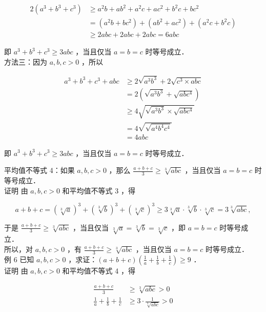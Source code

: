 \documentclass[10pt]{article}
\begin{document}
\[
\begin{aligned}
2\left(a^{3}+b^{3}+c^{3}\right) & \geqslant a^{2} b+a b^{2}+a^{2} c+a c^{2}+b^{2} c+b c^{2} \\
& =\left(a^{2} b+b c^{2}\right)+\left(a b^{2}+a c^{2}\right)+\left(a^{2} c+b^{2} c\right) \\
& \geqslant 2 a b c+2 a b c+2 a b c=6 a b c
\end{aligned}
\]

即 \(a^{3}+b^{3}+c^{3} \geqslant 3 a b c\) ，当且仅当 \(a=b=c\) 时等号成立．\\
方法三：因为 \(a, b, c>0\) ，所以

\[
\begin{aligned}
a^{3}+b^{3}+c^{3}+a b c & \geqslant 2 \sqrt{a^{3} b^{3}}+2 \sqrt{c^{3} \times a b c} \\
& =2\left(\sqrt{a^{3} b^{3}}+\sqrt{a b c^{4}}\right) \\
& \geqslant 4 \sqrt{\sqrt{a^{3} b^{3}} \times \sqrt{a b c^{4}}} \\
& =4 \sqrt{\sqrt{a^{4} b^{4} c^{4}}} \\
& =4 a b c
\end{aligned}
\]

即 \(a^{3}+b^{3}+c^{3} \geqslant 3 a b c\) ，当且仅当 \(a=b=c\) 时等号成立．

平均值不等式 4：如果 \(a, b, c>0\) ，那么 \(\frac{a+b+c}{3} \geqslant \sqrt[3]{a b c}\) ，当且仅当 \(a=b=c\) 时等号成立．\\
证明 由 \(a, b, c>0\) 和平均值不等式 3 ，得

\[
a+b+c=(\sqrt[3]{a})^{3}+(\sqrt[3]{b})^{3}+(\sqrt[3]{c})^{3} \geqslant 3 \sqrt[3]{a} \cdot \sqrt[3]{b} \cdot \sqrt[3]{c}=3 \sqrt[3]{a b c},
\]

于是 \(\frac{a+b+c}{3} \geqslant \sqrt[3]{a b c}\) ，当且仅当 \(\sqrt[3]{a}=\sqrt[3]{b}=\sqrt[3]{c}\) ，即 \(a=b=c\) 时等号成立．\\
所以，对 \(a, b, c>0\) ，有 \(\frac{a+b+c}{3} \geqslant \sqrt[3]{a b c}\) ，当且仅当 \(a=b=c\) 时等号成立．\\
例 6 已知 \(a, b, c>0\) ，求证：\((a+b+c)\left(\frac{1}{a}+\frac{1}{b}+\frac{1}{c}\right) \geqslant 9\) ．\\
证明 由 \(a, b, c>0\) 和平均值不等式 4 ，得

\[
\begin{aligned}
\frac{a+b+c}{3} & \geqslant \sqrt[3]{a b c}>0 \\
\frac{1}{a}+\frac{1}{b}+\frac{1}{c} & \geqslant 3 \cdot \frac{1}{\sqrt[3]{a b c}}>0
\end{aligned}
\]
\end{document}
